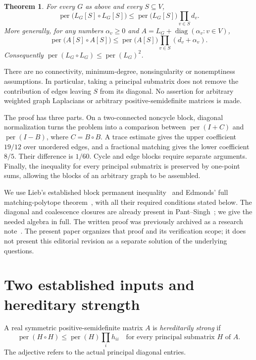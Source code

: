 \documentclass[11pt]{article}
\newtheorem{theorem}{Theorem}[section]
\theoremstyle{remark}\newtheorem{remark}[theorem]{Remark}
\DeclareMathOperator{\per}{per}
\begin{document}
\begin{theorem}\label{thm:main}
For every $G$ as above and every $S\subseteq V$,
\begin{equation}\label{eq:main}
\per\bigl(L_G[S]\circ L_G[S]\bigr)
\le \per\bigl(L_G[S]\bigr)\prod_{v\in S}d_v.
\end{equation}
More generally, for any numbers $\alpha_v\ge0$ and
$A=L_G+\operatorname{diag}(\alpha_v:v\in V)$,
\begin{equation}\label{eq:diagonal-main}
\per\bigl(A[S]\circ A[S]\bigr)
\le\per\bigl(A[S]\bigr)\prod_{v\in S}(d_v+\alpha_v).
\end{equation}
Consequently $\per(L_G\circ L_G)\le\per(L_G)^2$.
\end{theorem}

There are no connectivity, minimum-degree, nonsingularity or nonemptiness
assumptions. In particular, taking a principal submatrix does not remove
the contribution of edges leaving $S$ from its diagonal.
No assertion for arbitrary weighted graph Laplacians or arbitrary
positive-semidefinite matrices is made.

The proof has three parts. On a two-connected noncycle block, diagonal
normalization turns the problem into a comparison between $\per(I+C)$
and $\per(I-B)$, where $C=B\circ B$. A trace estimate gives the upper
coefficient $19/12$ over unordered edges, and a fractional matching gives
the lower coefficient $8/5$. Their difference is $1/60$.
Cycle and edge blocks require separate arguments. Finally, the inequality
for every principal submatrix is preserved by one-point sums, allowing
the blocks of an arbitrary graph to be assembled.

We use Lieb's established block permanent inequality~\cite{Lieb} and
Edmonds' full matching-polytope theorem~\cite{Edmonds}, with all their
required conditions stated below. The diagonal and coalescence closures
are already present in Pant--Singh~\cite[Theorem 4.3 and Appendix A]{PantSingh};
we give the needed algebra in full. The written proof was previously
archived as a research note~\cite{WrittenArchive}. The present paper
organizes that proof and its verification scope; it does not present this
editorial revision as a separate solution of the underlying questions.

\section{Two established inputs and hereditary strength}\label{sec:inputs}
A real symmetric positive-semidefinite matrix $A$ is
\emph{hereditarily strong} if
\begin{equation}\label{eq:hereditary}
\per(H\circ H)\le\per(H)\prod_i h_{ii}
\quad\text{for every principal submatrix }H\text{ of }A.
\end{equation}
The adjective refers to the actual principal diagonal entries.
\end{document}
